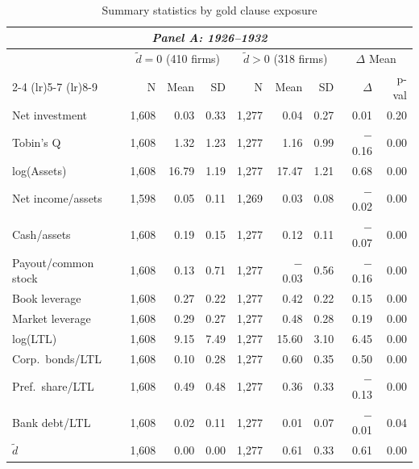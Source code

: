 \begin{table}[p]\centering
    \caption{\\ Summary statistics by gold clause exposure}
    \scriptsize
    \label{tab:sum_stats_tilde_d}
    
    \begin{threeparttable}
        \begin{tabular}{l rrr rrr rr}
            \toprule
            \multicolumn{9}{c}{\textit{Panel A: 1926--1932}} \\
            \midrule
             & \multicolumn{3}{c}{$\tilde{d} = 0$ (410 firms)} & \multicolumn{3}{c}{$\tilde{d} > 0$ (318 firms)} & \multicolumn{2}{c}{$\Delta$ Mean} \\
            \cmidrule(lr){2-4} \cmidrule(lr){5-7} \cmidrule(lr){8-9}
             & N & Mean & SD & N & Mean & SD & $\Delta$ & p-val \\
            Net investment & 1,608 & 0.03 & 0.33 & 1,277 & 0.04 & 0.27 & 0.01 & 0.20 \\
            Tobin's Q & 1,608 & 1.32 & 1.23 & 1,277 & 1.16 & 0.99 & $-$0.16 & 0.00 \\
            log(Assets) & 1,608 & 16.79 & 1.19 & 1,277 & 17.47 & 1.21 & 0.68 & 0.00 \\
            Net income/assets & 1,598 & 0.05 & 0.11 & 1,269 & 0.03 & 0.08 & $-$0.02 & 0.00 \\
            Cash/assets & 1,608 & 0.19 & 0.15 & 1,277 & 0.12 & 0.11 & $-$0.07 & 0.00 \\
            Payout/common stock & 1,608 & 0.13 & 0.71 & 1,277 & $-$0.03 & 0.56 & $-$0.16 & 0.00 \\
            Book leverage & 1,608 & 0.27 & 0.22 & 1,277 & 0.42 & 0.22 & 0.15 & 0.00 \\
            Market leverage & 1,608 & 0.29 & 0.27 & 1,277 & 0.48 & 0.28 & 0.19 & 0.00 \\
            log(LTL) & 1,608 & 9.15 & 7.49 & 1,277 & 15.60 & 3.10 & 6.45 & 0.00 \\
            Corp.\ bonds/LTL & 1,608 & 0.10 & 0.28 & 1,277 & 0.60 & 0.35 & 0.50 & 0.00 \\
            Pref.\ share/LTL & 1,608 & 0.49 & 0.48 & 1,277 & 0.36 & 0.33 & $-$0.13 & 0.00 \\
            Bank debt/LTL & 1,608 & 0.02 & 0.11 & 1,277 & 0.01 & 0.07 & $-$0.01 & 0.04 \\
            \ensuremath{\tilde{d}} & 1,608 & 0.00 & 0.00 & 1,277 & 0.61 & 0.33 & 0.61 & 0.00 \\

\end{tabular}
\end{threeparttable}
\end{table}
